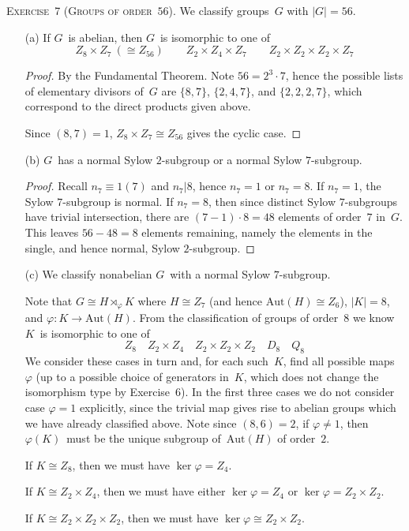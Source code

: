 \documentclass[letterpaper]{article}
\newcommand{\exercise}[1]{\goodbreak\noindent\textsc{Exercise~{#1}.}}
\newcommand{\iso}{\cong}
\newcommand{\aut}{\mathrm{Aut}}
\newcommand{\ord}[1]{|{#1}|}
\begin{document}
\bigskip
\exercise{7 (Groups of order~$56$)}
We classify groups~$G$ with $\ord{G}=56$.
\begin{enumerate}[itemsep=0pt]
\item[(a)] If $G$~is abelian, then $G$~is isomorphic to one of
$$Z_8\times Z_7\ (\iso Z_{56})\qquad Z_2\times Z_4\times Z_7\qquad Z_2\times Z_2\times Z_2\times Z_7$$
\begin{proof}
By the Fundamental Theorem. Note $56=2^3\cdot 7$, hence the possible lists of elementary divisors of~$G$ are $\{8,7\}$, $\{2,4,7\}$, and $\{2,2,2,7\}$, which correspond to the direct products given above.

Since $(8,7)=1$, $Z_8\times Z_7\iso Z_{56}$ gives the cyclic case.
\end{proof}
\item[(b)] $G$~has a normal Sylow $2$-subgroup or a normal Sylow $7$-subgroup.
\begin{proof}
Recall $n_7\equiv 1(7)$ and $n_7|8$, hence $n_7=1$ or $n_7=8$. If $n_7=1$, the Sylow $7$-subgroup is normal. If $n_7=8$, then since distinct Sylow $7$-subgroups have trivial intersection, there are $(7-1)\cdot 8=48$ elements of order~$7$ in~$G$. This leaves $56-48=8$ elements remaining, namely the elements in the single, and hence normal, Sylow $2$-subgroup.
\end{proof}
\item[(c)] We classify nonabelian $G$~with a normal Sylow $7$-subgroup.

Note that $G\iso H\rtimes_{\varphi}K$ where $H\iso Z_7$ (and hence $\aut(H)\iso Z_6$), $\ord{K}=8$, and $\varphi:K\to\aut(H)$. From the classification of groups of order~$8$ we know $K$~is isomorphic to one of
$$Z_8\quad Z_2\times Z_4\quad Z_2\times Z_2\times Z_2\quad D_8\quad Q_8$$
We consider these cases in turn and, for each such~$K$, find all possible maps~$\varphi$ (up to a possible choice of generators in~$K$, which does not change the isomorphism type by Exercise~6). In the first three cases we do not consider case $\varphi=1$ explicitly, since the trivial map gives rise to abelian groups which we have already classified above. Note since $(8,6)=2$, if $\varphi\ne1$, then $\varphi(K)$~must be the unique subgroup of~$\aut(H)$ of order~$2$.

If $K\iso Z_8$, then we must have $\ker\varphi=Z_4$.

If $K\iso Z_2\times Z_4$, then we must have either $\ker\varphi=Z_4$ or $\ker\varphi=Z_2\times Z_2$.

If $K\iso Z_2\times Z_2\times Z_2$, then we must have $\ker\varphi\iso Z_2\times Z_2$.


\end{enumerate}
\end{document}
